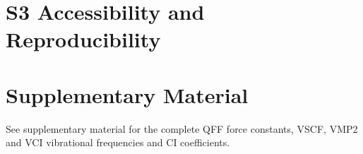\documentclass[aip,jcp,showpacs,superscriptaddress,groupedaddress]{revtex4-1}  %
\begin{document}
\section{\label{sec:reproduce}S3 Accessibility and Reproducibility}



\section*{\label{sec:level1}Supplementary Material}
See supplementary material for the complete QFF force constants, VSCF, VMP2 and VCI vibrational frequencies and CI coefficients. 







%
\end{document}
